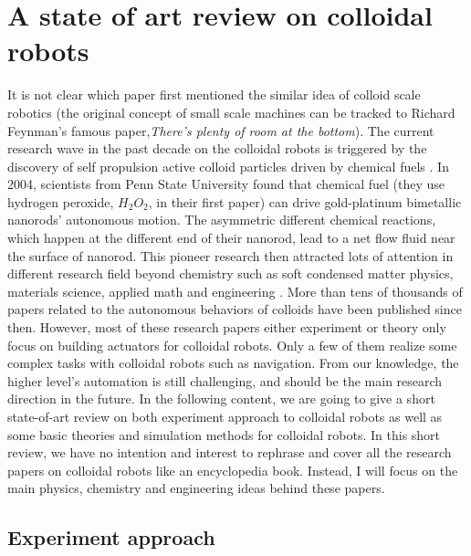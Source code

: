 \section{A state of art review on colloidal robots }
It is not clear which paper first mentioned the similar idea of colloid scale robotics (the original concept of  small scale machines can be tracked to Richard Feynman's famous paper,\textit{There's plenty of room at the bottom}\autocite{feynman1960there}). The current research wave in the past decade on the colloidal robots is triggered by the discovery of self propulsion active colloid particles driven by chemical fuels \autocite{paxton2004catalytic}. In 2004, scientists from Penn State University found that chemical fuel (they use hydrogen peroxide, $H_2O_2$,  in their first paper) can drive  gold-platinum bimetallic nanorods' autonomous motion. The asymmetric different chemical reactions, which happen at the different end of their nanorod,  lead to a net flow fluid near the surface of nanorod. This pioneer research then attracted lots of attention in different research field beyond chemistry such as soft condensed matter physics\autocite{Marchetti2013}, materials science\autocite{han2018engineering}, applied math\autocite{fodor2016far} and engineering \autocite{sitti2015biomedical}. More than tens of thousands of papers related to the autonomous behaviors of colloids have been published since then. However, most of these research papers either experiment or theory only focus on building actuators for colloidal robots. Only a few of them realize some complex tasks with colloidal robots such as navigation. From our knowledge, the higher level's automation is still challenging, and should be the main research direction in the future. In the following content, we are going to give a short state-of-art review on both experiment approach to colloidal robots as well as some basic theories and simulation methods for colloidal robots. In this short review, we have no intention and interest to rephrase and cover all the research papers on colloidal robots like an encyclopedia book. Instead,  I will focus on the main physics, chemistry and engineering ideas behind these papers. 

\subsection{Experiment approach}

